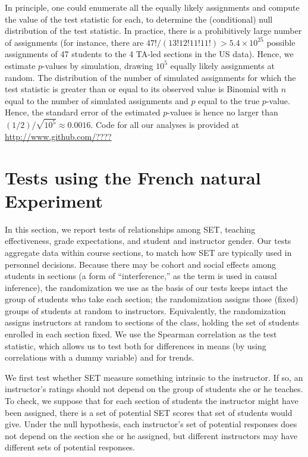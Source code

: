 \documentclass[12pt]{article}
\newcommand{\todo}[1]{{\color{red}{TO DO: \sc #1}}}
\begin{document}
In principle, one could enumerate all the equally likely assignments and compute the value
of the test statistic for each, to determine the (conditional) null distribution of the test
statistic.
In practice, there is a prohibitively large number of assignments
(for instance, there are $47!/(13! 12! 11! 11!) > 5.4 \times 10^25$ possible assignments
of 47 students to the 4 TA-led sections in the US data).
Hence, we estimate $p$-values by simulation, drawing $10^5$ equally likely assignments
at random.
The distribution of the number of simulated assignments for which the test statistic
is greater than or equal to its observed value is Binomial with $n$ equal to the number of
simulated assignments and $p$ equal to the true $p$-value.
Hence, the standard error of the estimated $p$-values is hence no larger than 
$(1/2)/ \sqrt{10^5}
\approx 0.0016$.
Code for all our analyses is provided at \url{http://www.github.com/????} \todo{Fix!}

\section{Tests using the French natural Experiment}
In this section, we report tests of relationships among
SET, teaching effectiveness, grade expectations, and student and instructor gender.
Our tests aggregate data within course sections, to match how SET are typically
used in personnel decisions. 
Because there may be cohort and social effects among students in sections (a form of
``interference,'' as the term is used in causal inference), the randomization we
use as the basis of our tests keeps intact the group of students who take each section;
the randomization assigns those (fixed) groups of students at random to instructors.
Equivalently, the randomization assigns instructors at random to sections of the class,
holding the set of students enrolled in each section fixed.
We use the Spearman correlation as the test statistic, which allows us to test both for 
differences in means (by using correlations with a dummy variable) and for 
trends.

We first test whether SET measure something intrinsic to the instructor.  
If so, an instructor's ratings should not depend on the group of students she or he teaches.
To check, we suppose that for each section of students the instructor might have been
assigned, there is a set of potential SET scores that set of students would give.
Under the null hypothesis, each instructor's set of potential responses does not depend
on the section she or he assigned, but different instructors may have different sets of
potential responses.
\end{document}
